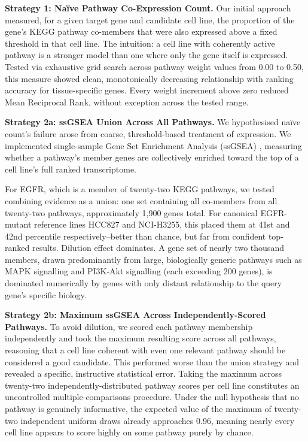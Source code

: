 \documentclass[author={Karen Coutinho, Ishaan Bhalla, Aman Raj, Dixit Kaloorani Malarmannan},
                supervisor={Dr. Daniel D'Andrea},
                degree={MSc},
                title={CellSelector Omics: A Multi-Omics Recommendation System for Cell Line Selection},
                subtitle={},
                type={},
                year={2026}]{dissertation}
\begin{document}
{\bf Strategy 1: Naïve Pathway Co-Expression Count.} Our initial approach measured, for a given target gene and candidate cell line, the proportion of the gene's KEGG pathway co-members that were also expressed above a fixed threshold in that cell line. The intuition: a cell line with coherently active pathway is a stronger model than one where only the gene itself is expressed. Tested via exhaustive grid search across pathway weight values from 0.00 to 0.50, this measure showed clean, monotonically decreasing relationship with ranking accuracy for tissue-specific genes. Every weight increment above zero reduced Mean Reciprocal Rank, without exception across the tested range.

{\bf Strategy 2a: ssGSEA Union Across All Pathways.} We hypothesised naïve count's failure arose from coarse, threshold-based treatment of expression. We implemented single-sample Gene Set Enrichment Analysis (ssGSEA) \cite{barbie2009ssgsea}, measuring whether a pathway's member genes are collectively enriched toward the top of a cell line's full ranked transcriptome.

For EGFR, which is a member of twenty-two KEGG pathways, we tested combining evidence as a union: one set containing all co-members from all twenty-two pathways, approximately 1,900 genes total. For canonical EGFR-mutant reference lines HCC827 and NCI-H3255, this placed them at 41st and 42nd percentile respectively--better than chance, but far from confident top-ranked results. Dilution effect dominates. A gene set of nearly two thousand members, drawn predominantly from large, biologically generic pathways such as MAPK signalling and PI3K-Akt signalling (each exceeding 200 genes), is dominated numerically by genes with only distant relationship to the query gene's specific biology.

{\bf Strategy 2b: Maximum ssGSEA Across Independently-Scored Pathways.} To avoid dilution, we scored each pathway membership independently and took the maximum resulting score across all pathways, reasoning that a cell line coherent with even one relevant pathway should be considered a good candidate. This performed worse than the union strategy and revealed a specific, instructive statistical error. Taking the maximum across twenty-two independently-distributed pathway scores per cell line constitutes an uncontrolled multiple-comparisons procedure. Under the null hypothesis that no pathway is genuinely informative, the expected value of the maximum of twenty-two independent uniform draws already approaches 0.96, meaning nearly every cell line appears to score highly on some pathway purely by chance.
\end{document}
